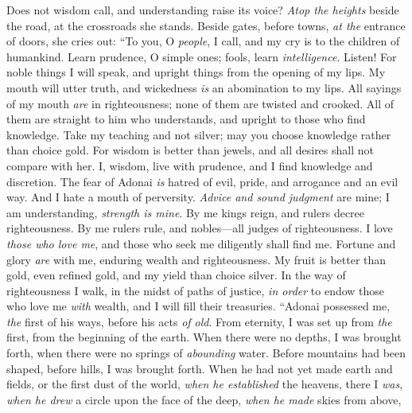 \begin{biblechapter} %
 Does not wisdom call, 
and understanding raise its voice?
\verse \textit{Atop the heights} beside the road, 
at the crossroads she stands.
\verse Beside gates, before towns, 
\textit{at the} entrance of doors, she cries out:
\verse “To you, O \textit{people}, I call, 
and my cry is to the children of humankind.
\verse Learn prudence, O simple ones; 
fools, learn \textit{intelligence}.
\verse Listen! For noble things I will speak, 
and upright things from the opening of my lips.
\verse My mouth will utter truth, 
and wickedness \textit{is} an abomination to my lips.
\verse All sayings of my mouth \textit{are} in righteousness; 
none of them are twisted and crooked.
\verse All of them are straight to him who understands, 
and upright to those who find knowledge.
\verse Take my teaching and not silver; 
may you choose knowledge rather than choice gold.
\verse For wisdom is better than jewels, 
and all desires shall not compare with her.
\verse I, wisdom, live with prudence, 
and I find knowledge and discretion.
\verse The fear of Adonai \textit{is} hatred of evil, 
pride, and arrogance and an evil way. 
And I hate a mouth of perversity.
\verse \textit{Advice and sound judgment} are mine; 
I am understanding, \textit{strength is mine}.
\verse By me kings reign, 
and rulers decree righteousness.
\verse By me rulers rule, 
and nobles—all judges of righteousness.
\verse I love \textit{those who love me}, 
and those who seek me diligently shall find me.
\verse Fortune and glory \textit{are} with me, 
enduring wealth and righteousness.
\verse My fruit is better than gold, even refined gold, 
and my yield than choice silver.
\verse In the way of righteousness I walk, 
in the midst of paths of justice,
\verse \textit{in order} to endow those who love me \textit{with} wealth, 
and I will fill their treasuries.
 “Adonai possessed me, \textit{the} first of his ways, 
before his acts \textit{of old}.
\verse From eternity, I was set up from \textit{the} first, 
from the beginning of the earth.
\verse When there were no depths, I was brought forth, 
when there were no springs of \textit{abounding} water.
\verse Before mountains had been shaped, 
before hills, I was brought forth.
\verse When he had not yet made earth and fields, 
or the first dust of the world,
\verse \textit{when he established} the heavens, there I \textit{was}, 
\textit{when he drew} a circle upon the face of the deep,
\verse \textit{when he made} skies from above, 

\end{biblechapter}
